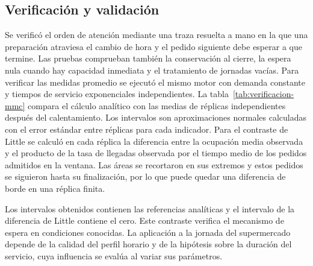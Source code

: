 \subsection{Verificación y validación}
Se verificó el orden de atención mediante una traza resuelta a mano en la que una preparación atraviesa el cambio de hora y el pedido siguiente debe esperar a que termine.
Las pruebas comprueban también la conservación al cierre, la espera nula cuando hay capacidad inmediata y el tratamiento de jornadas vacías.
Para verificar las medidas promedio se ejecutó el mismo motor con demanda constante y tiempos de servicio exponenciales independientes.
La tabla~\ref{tab:verificacion-mmc} compara el cálculo analítico con las medias de réplicas independientes después del calentamiento.
Los intervalos son aproximaciones normales calculadas con el error estándar entre réplicas para cada indicador.
Para el contraste de Little se calculó en cada réplica la diferencia entre la ocupación media observada y el producto de la tasa de llegadas observada por el tiempo medio de los pedidos admitidos en la ventana.
Las áreas se recortaron en sus extremos y estos pedidos se siguieron hasta su finalización, por lo que puede quedar una diferencia de borde en una réplica finita.

Los intervalos obtenidos contienen las referencias analíticas y el intervalo de la diferencia de Little contiene el cero.
Este contraste verifica el mecanismo de espera en condiciones conocidas.
La aplicación a la jornada del supermercado depende de la calidad del perfil horario y de la hipótesis sobre la duración del servicio, cuya influencia se evalúa al variar sus parámetros.
